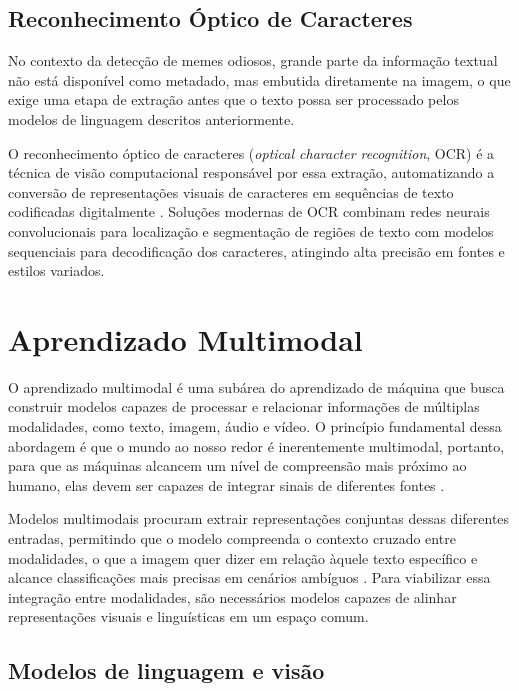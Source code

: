 \subsection{Reconhecimento Óptico de Caracteres}

No contexto da detecção de memes odiosos, grande parte da informação textual 
não está disponível como metadado, mas embutida diretamente na imagem, o que 
exige uma etapa de extração antes que o texto possa ser processado pelos 
modelos de linguagem descritos anteriormente. 

O reconhecimento óptico de 
caracteres (\textit{optical character recognition}, OCR) é a técnica de visão 
computacional responsável por essa extração, automatizando a conversão de 
representações visuais de caracteres em sequências de texto codificadas 
digitalmente \cite{mori1992}. Soluções modernas de OCR combinam redes neurais 
convolucionais para localização e segmentação de regiões de texto com modelos 
sequenciais para decodificação dos caracteres, atingindo alta precisão em 
fontes e estilos variados.

\section{Aprendizado Multimodal}

O aprendizado multimodal é uma subárea do aprendizado de máquina que busca construir modelos capazes de processar e relacionar informações de múltiplas modalidades, como texto, imagem, áudio e vídeo. O princípio fundamental dessa abordagem é que o mundo ao nosso redor é inerentemente multimodal, portanto, para que as máquinas alcancem um nível de compreensão mais próximo ao humano, elas devem ser capazes de integrar sinais de diferentes fontes \cite{wu2024}.

Modelos multimodais procuram extrair representações conjuntas dessas diferentes entradas, permitindo que o modelo compreenda o contexto cruzado entre modalidades, o que a imagem quer dizer em relação àquele texto específico e alcance classificações mais precisas em cenários ambíguos \cite{yuan2023}. Para viabilizar essa integração entre modalidades, são necessários modelos capazes de alinhar representações visuais e linguísticas em um espaço comum.

\subsection{Modelos de linguagem e visão}

